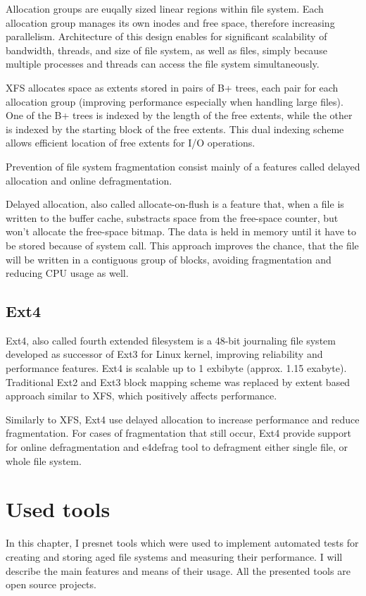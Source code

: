 \documentclass[
  color, %
  table, %
  lof,   %
  lot,   %
]{fithesis3}
\begin{document}
Allocation groups are euqally sized linear regions within file system. Each allocation group manages its own inodes and free space, therefore increasing parallelism. Architecture of this design enables for significant scalability of bandwidth, threads, and size of file system, as well as files, simply because multiple processes and threads can access the file system simultaneously.

XFS allocates space as extents stored in pairs of B+ trees, each pair for each allocation group (improving performance especially when handling large files). One of the B+ trees is indexed by the length of the free extents, while the other is indexed by the starting block of the free extents. This dual indexing scheme allows efficient location of free extents for I/O operations.

Prevention of file system fragmentation consist mainly of a features called delayed allocation and online defragmentation.

Delayed allocation, also called allocate-on-flush is a feature that, when a file is written to the buffer cache, substracts space from the free-space counter, but won't allocate the free-space bitmap. The data is held in memory until it have to be stored because of system call. This approach improves the chance, that the file will be written in a contiguous group of blocks, avoiding fragmentation and reducing CPU usage as well.

\section{Ext4}
Ext4, also called fourth extended filesystem is a 48-bit journaling file system developed as successor of Ext3 for Linux kernel, improving reliability and performance features. Ext4 is scalable up to 1 exbibyte (approx. 1.15 exabyte). Traditional Ext2 and Ext3 block mapping scheme was replaced by extent based approach similar to XFS, which positively affects performance.

Similarly to XFS, Ext4 use delayed allocation to increase performance and reduce fragmentation. For cases of fragmentation that still occur, Ext4 provide support for online defragmentation and e4defrag tool to defragment either single file, or whole file system.

\chapter{Used tools}
In this chapter, I presnet tools which were used to implement automated tests for creating and storing aged file systems and measuring their performance. I will describe the main features and means of their usage. All the presented tools are open source projects.
\end{document}
